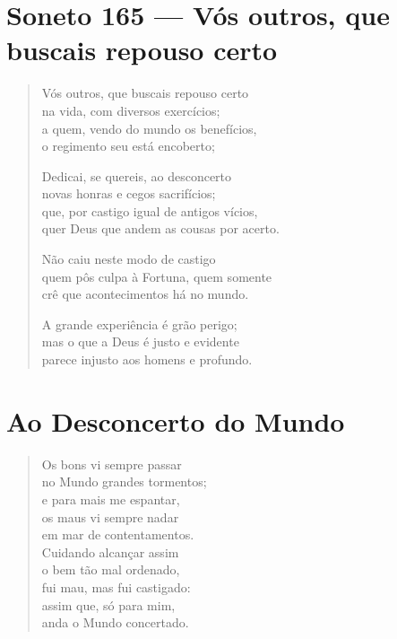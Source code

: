 \documentclass[10pt,a5paper,oneside]{book}
\begin{document}
\chapter{Soneto 165 --- Vós outros, que buscais repouso certo}

\begin{verse}
Vós outros, que buscais repouso certo\\
na vida, com diversos exercícios;\\
a quem, vendo do mundo os benefícios,\\
o regimento seu está encoberto;

Dedicai, se quereis, ao desconcerto\\
novas honras e cegos sacrifícios;\\
que, por castigo igual de antigos vícios,\\
quer Deus que andem as cousas por acerto.

Não caiu neste modo de castigo\\
quem pôs culpa à Fortuna, quem somente\\
crê que acontecimentos há no mundo.

A grande experiência é grão perigo;\\
mas o que a Deus é justo e evidente\\
parece injusto aos homens e profundo.
\end{verse}

\chapter{Ao Desconcerto do Mundo}

\begin{verse}
Os bons vi sempre passar\\
no Mundo grandes tormentos;\\
e para mais me espantar,\\
os maus vi sempre nadar\\
em mar de contentamentos.\\
Cuidando alcançar assim\\
o bem tão mal ordenado,\\
fui mau, mas fui castigado:\\
assim que, só para mim,\\
anda o Mundo concertado.
\end{verse}
\end{document}
